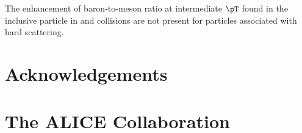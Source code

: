 \documentclass[ALICE,manyauthors]{cernphprep}
\begin{document}
The enhancement of baron-to-meson ratio at intermediate $\pT$ found in the inclusive particle in \pp and \pPb collisions are not present for particles associated with hard scattering.

\newenvironment{acknowledgement}{\relax}{\relax}
\begin{acknowledgement}
\section*{Acknowledgements}
%

\end{acknowledgement}




\newpage
\appendix

\section{The ALICE Collaboration}
\label{app:collab}
%  
\end{document}
